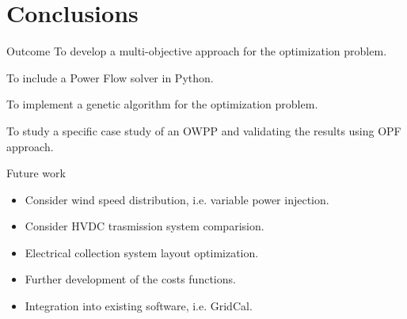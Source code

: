 \section{Conclusions}
\begin{frame}{}
    \tableofcontents[currentsection]
\end{frame}


\begin{frame}{Outcome}
    \textcolor{green}{} To develop a multi-objective approach for the optimization problem.

    \textcolor{green}{} To include a Power Flow solver in Python.

    \textcolor{green}{} To implement a genetic algorithm for the optimization problem.

    \textcolor{green}{} To study a specific case study of an OWPP and validating the results using OPF approach.
    
\end{frame}



\begin{frame}{Future work}
    \begin{itemize}
        \item Consider wind speed distribution, i.e. variable power injection.
        \item Consider HVDC trasmission system comparision.
        \item Electrical collection system layout optimization.
        \item Further development of the costs functions.
        \item Integration into existing software, i.e. GridCal.
    \end{itemize}
\end{frame}

